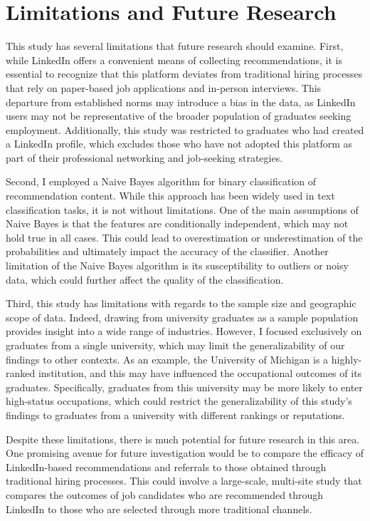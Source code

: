 \documentclass[12pt]{caltech_thesis}
\begin{document}
\chapter{Limitations and Future Research}
This study has several limitations that future research should examine. First, while LinkedIn offers a convenient means of collecting recommendations, it is essential to recognize that this platform deviates from traditional hiring processes that rely on paper-based job applications and in-person interviews. This departure from established norms may introduce a bias in the data, as LinkedIn users may not be representative of the broader population of graduates seeking employment. Additionally, this study was restricted to graduates who had created a LinkedIn profile, which excludes those who have not adopted this platform as part of their professional networking and job-seeking strategies.

Second, I employed a Naive Bayes algorithm for binary classification of recommendation content. While this approach has been widely used in text classification tasks, it is not without limitations. One of the main assumptions of Naive Bayes is that the features are conditionally independent, which may not hold true in all cases. This could lead to overestimation or underestimation of the probabilities and ultimately impact the accuracy of the classifier. Another limitation of the Naive Bayes algorithm is its susceptibility to outliers or noisy data, which could further affect the quality of the classification. 

Third, this study has limitations with regards to the sample size and geographic scope of data. Indeed, drawing from university graduates as a sample population provides insight into a wide range of industries. However, I focused exclusively on graduates from a single university, which may limit the generalizability of our findings to other contexts. As an example, the University of Michigan is a highly-ranked institution, and this may have influenced the occupational outcomes of its graduates. Specifically, graduates from this university may be more likely to enter high-status occupations, which could restrict the generalizability of this study’s findings to graduates from a university with different rankings or reputations.

Despite these limitations, there is much potential for future research in this area. One promising avenue for future investigation would be to compare the efficacy of LinkedIn-based recommendations and referrals to those obtained through traditional hiring processes. This could involve a large-scale, multi-site study that compares the outcomes of job candidates who are recommended through LinkedIn to those who are selected through more traditional channels.
\end{document}
